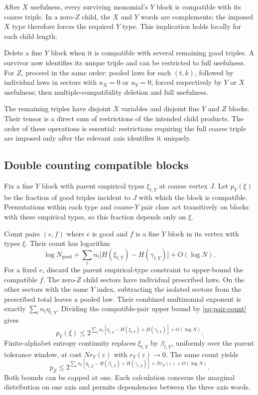 \documentclass[11pt,a4paper]{article}
\newcommand{\Ngood}{N_{\mathrm{good}}}
\begin{document}
After $X$ usefulness, every surviving monomial's $Y$ block is compatible with its coarse triple. In a zero-$Z$ child, the $X$ and $Y$ words are complements; the imposed $X$ type therefore forces the required $Y$ type. This implication holds locally for each child length.

Delete a fine $Y$ block when it is compatible with several remaining good triples. A survivor now identifies its unique triple and can be restricted to full usefulness. For $Z$, proceed in the same order: pooled laws for each $(t,k)$, followed by individual laws in sectors with $u_X=0$ or $u_Y=0$, forced respectively by $Y$ or $X$ usefulness; then multiple-compatibility deletion and full usefulness.

The remaining triples have disjoint $X$ variables and disjoint fine $Y$ and $Z$ blocks. Their tensor is a direct sum of restrictions of the intended child products. The order of these operations is essential: restrictions requiring the full coarse triple are imposed only after the relevant axis identifies it uniquely.

\subsection{Double counting compatible blocks}

Fix a fine $Y$ block with parent empirical types $\xi_{t,Y}$ at coarse vertex $J$. Let $p_Y(\xi)$ be the fraction of good triples incident to $J$ with which the block is compatible. Permutations within each type and coarse-$Y$ pair class act transitively on blocks with these empirical types, so this fraction depends only on $\xi$.

Count pairs $(e,f)$ where $e$ is good and $f$ is a fine $Y$ block in its vertex with types $\xi$. Their count has logarithm
\begin{equation}\label{eq:pair-count}
\log\Ngood+\sum_t n_t\bigl[H(\xi_{t,Y})-H(\gamma_{t,Y})\bigr]+O(\log N).
\end{equation}
For a fixed $e$, discard the parent empirical-type constraint to upper-bound the compatible $f$. The zero-$Z$ child sectors have individual prescribed laws. On the other sectors with the same $Y$ index, subtracting the isolated sectors from the prescribed total leaves a pooled law. Their combined multinomial exponent is exactly $\sum_t n_t\eta_{t,Y}$. Dividing the compatible-pair upper bound by \cref{eq:pair-count} gives
\begin{equation}\label{eq:compatibility-bound}
p_Y(\xi)\le
2^{\sum_t n_t[\eta_{t,Y}-H(\xi_{t,Y})+H(\gamma_{t,Y})]+O(\log N)}.
\end{equation}
Finite-alphabet entropy continuity replaces $\xi_{t,Y}$ by $\beta_{t,Y}$, uniformly over the parent tolerance window, at cost $Nr_Y(\varepsilon)$ with $r_Y(\varepsilon)\to0$. The same count yields
\begin{equation}
p_Z\le
2^{\sum_t n_t[\eta_{t,Z}-H(\beta_{t,Z})+H(\gamma_{t,Z})]
+Nr_Z(\varepsilon)+O(\log N)}.
\end{equation}
Both bounds can be capped at one. Each calculation concerns the marginal distribution on one axis and permits dependencies between the three axis words.
\end{document}
